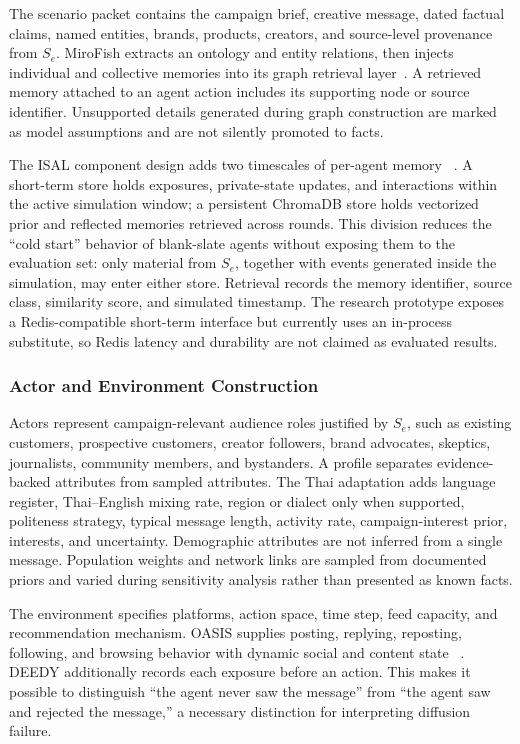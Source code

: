 \documentclass[conference]{IEEEtran}
\begin{document}
The scenario packet contains the campaign brief, creative message, dated
factual claims, named entities, brands, products, creators, and source-level
provenance from $S_e$.
MiroFish extracts an ontology and entity relations, then injects individual and
collective memories into its graph retrieval layer~\cite{mirofish2026}. A
retrieved memory attached to an agent action includes its supporting node or
source identifier. Unsupported details generated during graph construction are
marked as model assumptions and are not silently promoted to facts.

The ISAL component design adds two timescales of per-agent memory
~\cite{marketfish2026architecture}. A short-term
store holds exposures, private-state updates, and interactions within the
active simulation window; a persistent ChromaDB store holds vectorized prior
and reflected memories retrieved across rounds. This division reduces the
``cold start'' behavior of blank-slate agents without exposing them to the
evaluation set: only material from $S_e$, together with events generated inside
the simulation, may enter either store. Retrieval records the memory identifier,
source class, similarity score, and simulated timestamp. The research
prototype exposes a Redis-compatible short-term interface but currently uses
an in-process substitute, so Redis latency and durability are not claimed as
evaluated results.

\subsubsection{Actor and Environment Construction}

Actors represent campaign-relevant audience roles justified by $S_e$, such as
existing customers, prospective customers, creator followers, brand advocates,
skeptics, journalists, community members, and bystanders. A profile separates
evidence-backed attributes from sampled attributes. The Thai adaptation adds
language register, Thai--English mixing rate, region or dialect only when
supported, politeness strategy, typical message length, activity rate,
campaign-interest prior, interests, and uncertainty. Demographic attributes
are not inferred from a single message. Population weights and network links
are sampled from documented priors and varied during sensitivity analysis
rather than presented as known facts.

The environment specifies platforms, action space, time step, feed capacity,
and recommendation mechanism. OASIS supplies posting, replying, reposting,
following, and browsing behavior with dynamic social and content state
~\cite{yang2024oasis}. DEEDY additionally records each exposure before an
action. This makes it possible to distinguish ``the agent never saw the
message'' from ``the agent saw and rejected the message,'' a necessary
distinction for interpreting diffusion failure.
\end{document}
